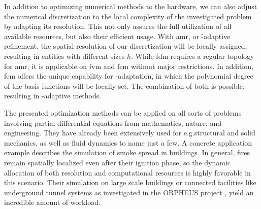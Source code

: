 
In addition to optimizing numerical methods to the hardware, we can also adjust the numerical discretization to the local complexity of the investigated problem by adapting its resolution.
This not only assures the full utilization of all available resources, but also their efficient usage.
With \Gls{amr}, or \h-adaptive refinement, the spatial resolution of our discretization will be locally assigned, resulting in entities with different sizes $h$. While \gls{fdm} requires a regular topology for \gls{amr}, it is applicable on \gls{fvm} and \gls{fem} without major restrictions. In addition, \gls{fem} offers the unique capability for \p-adaptation, in which the polynomial degree of the basis functions will be locally set. The combination of both is possible, resulting in \hp-adaptive methods.


The presented optimization methods can be applied on all sorts of problems involving partial differential equations from mathematics, nature, and engineering. They have already been extensively used for e.g.\@ structural and solid mechanics, as well as fluid dynamics to name just a few.
A concrete application example describes the simulation of smoke spread in buildings.
In general, fires remain spatially localized even after their ignition phase, so the dynamic allocation of both resolution and computational resources is highly favorable in this scenario.
Their simulation on large scale buildings or connected facilities like underground tunnel systems as investigated in the ORPHEUS project , yield an incredible amount of workload.

